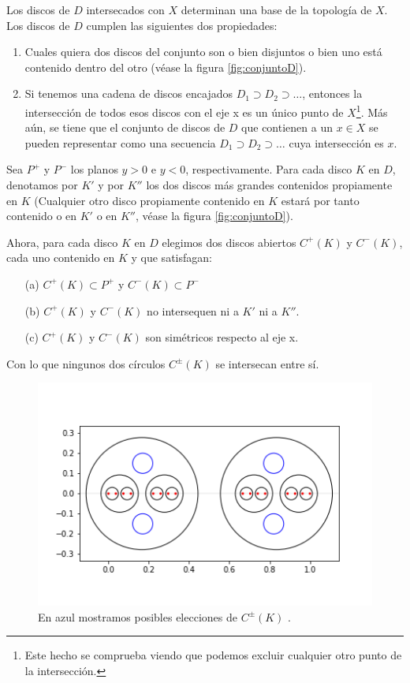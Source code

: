 \documentclass[a4paper,11pt,spanish, twoside, leqno]{tfg-uam}
\theoremstyle{definition}
\begin{document}
Los discos de $D$ intersecados con $X$ determinan una base de la topología de $X$. Los discos de $D$ cumplen las siguientes dos propiedades:
\begin{enumerate}
\item Cuales quiera dos discos del conjunto son o bien disjuntos o bien uno está contenido dentro del otro (véase la figura \ref{fig:conjuntoD}).
\item Si tenemos una cadena de discos encajados $D_1 \supset D_2 \supset \ldots$, entonces la intersección de todos esos discos  con el eje x es un único punto de $X$\footnote{Este hecho se comprueba viendo que podemos excluir cualquier otro punto de la intersección.}. Más aún, se tiene que el conjunto de discos de $D$ que contienen a un $x \in X$ se pueden representar como una secuencia $D_1 \supset D_2 \supset \ldots$ cuya intersección es $x$.
\end{enumerate}
Sea $P^+$ y $P^-$ los planos $y > 0 $ e $y < 0$, respectivamente. Para cada disco $K$ en $D$, denotamos por $K'$ y por $K''$ los dos discos más grandes contenidos propiamente en $K$ (Cualquier otro disco propiamente contenido en $K$ estará por tanto contenido o en $K'$ o en $K''$, véase la figura \ref{fig:conjuntoD}).

Ahora, para cada disco $K$ en $D$ elegimos dos discos abiertos $C^+(K)$ y $C^-(K)$, cada uno contenido en $K$  y que satisfagan:
\begin{enumerate}
\item[(a)] $C^+(K) \subset P^+$ y $C^-(K) \subset P^-$
\item[(b)] $C^+(K)$ y $C^-(K)$ no intersequen ni a $K'$ ni a $K''$.
\item[(c)] $C^+(K)$ y $C^-(K)$ son simétricos respecto al eje x.
\end{enumerate}
Con lo que ningunos dos círculos $C^\pm(K)$ se intersecan entre sí.

\begin{figure}[h!]
	\centering
	\includegraphics[width=0.5\linewidth]{imagenes/eleccionCK.png}
	\caption{En azul mostramos posibles elecciones de $C^\pm(K)$ .}
	\label{fig:eleccionCK}
\end{figure}
\end{document}
